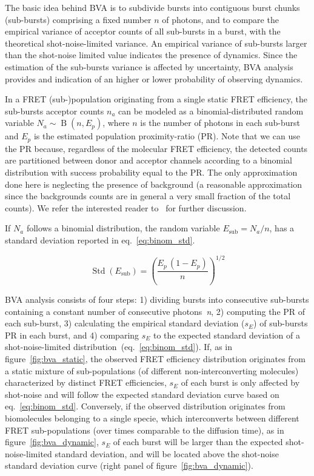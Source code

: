 \documentclass[10pt,letterpaper]{article}
\begin{document}
The basic idea behind BVA is to subdivide bursts into contiguous burst chunks (sub-bursts)
comprising a fixed number $n$ of photons,
and to compare the empirical variance of acceptor counts of all sub-bursts in a burst,
with the theoretical shot-noise-limited variance.
An empirical variance of sub-bursts larger than the shot-noise limited value indicates
the presence of dynamics. Since the estimation of the sub-bursts variance is affected
by uncertainty, BVA analysis provides and indication of an higher or lower probability
of observing dynamics.

In a FRET (sub-)population originating from a single static FRET efficiency,
the sub-bursts acceptor counts $n_a$ can be modeled as a binomial-distributed random variable 
$N_a \sim \operatorname{B}(n, E_p)$, where $n$ is the number of photons in each sub-burst and 
$E_p$ is the estimated population proximity-ratio (PR). 
Note that we can use the PR because, regardless of the molecular FRET efficiency, 
the detected counts are partitioned between donor and acceptor channels according to
a binomial distribution with success probability equal to the PR.
The only approximation done here is neglecting the presence of background
(a reasonable approximation since the backgrounds counts are in general a 
very small fraction of the total counts). 
We refer the interested reader to~\cite{Torella_2011} for further discussion.

If $N_a$ follows a binomial distribution, the random variable $E_{\textrm{sub}} = N_a/n$,
has a standard deviation reported in eq.~\ref{eq:binom_std}. 

\begin{equation}
\label{eq:binom_std}
\operatorname{Std}(E_{\textrm{sub}}) = \left( \frac{E_p\,(1 - E_p)}{n} \right)^{1/2}
\end{equation}

BVA analysis consists of four steps: 1) dividing bursts into consecutive sub-bursts 
containing a constant number of consecutive photons~\textit{n}, 2) computing the PR 
of each sub-burst, 3) calculating the empirical standard deviation ($s_E$) of sub-bursts
PR in each burst, and 4) comparing $s_E$ to the expected standard deviation 
of a shot-noise-limited distribution~(eq.~\ref{eq:binom_std}).
If, as in figure~\ref{fig:bva_static}, the observed FRET efficiency distribution 
originates from a static mixture of sub-populations (of different 
non-interconverting molecules) characterized by distinct FRET efficiencies, 
$s_E$ of each burst is only affected by shot-noise and will follow the expected 
standard deviation curve based on eq.~\ref{eq:binom_std}. 
Conversely, if the observed distribution originates from biomolecules belonging to a single specie, 
which interconverts between different FRET sub-populations (over times comparable to the diffusion 
time), as in figure~\ref{fig:bva_dynamic}, $s_E$ of each burst will be larger than the expected 
shot-noise-limited standard deviation, and will be located above the shot-noise standard 
deviation curve (right panel of figure~\ref{fig:bva_dynamic}).
\end{document}
